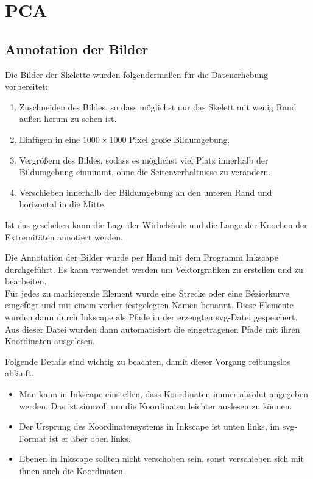 \section{PCA}
\label{implementation_detail_pca}

\subsection{Annotation der Bilder}

Die Bilder der Skelette wurden folgendermaßen für die Datenerhebung vorbereitet:
 
 \begin{enumerate}
  \item Zuschneiden des Bildes, so dass möglichst nur das Skelett mit wenig Rand außen herum zu sehen ist.
  \item Einfügen in eine $1000 \times 1000$ Pixel große Bildumgebung.
  \item Vergrößern des Bildes, sodass es möglichst viel Platz innerhalb der Bildumgebung einnimmt, ohne die Seitenverhältnisse zu verändern.
  \item Verschieben innerhalb der Bildumgebung an den unteren Rand und horizontal in die Mitte.
 \end{enumerate}

 Ist das geschehen kann die Lage der Wirbelsäule und die Länge der Knochen der Extremitäten annotiert werden.
 
Die Annotation der Bilder wurde per Hand mit dem Programm Inkscape \cite{inkscape} durchgeführt. Es kann verwendet werden um Vektorgrafiken zu erstellen und zu bearbeiten.\\
Für jedes zu markierende Element wurde eine Strecke oder eine Bézierkurve eingefügt und mit einem vorher festgelegten Namen benannt. Diese Elemente wurden dann durch Inkscape als Pfade in der erzeugten svg-Datei gespeichert. Aus dieser Datei wurden dann automatisiert die eingetragenen Pfade mit ihren Koordinaten ausgelesen.

Folgende Details sind wichtig zu beachten, damit dieser Vorgang reibungslos abläuft. 
\begin{itemize}
 \item Man kann in Inkscape einstellen, dass Koordinaten immer absolut angegeben werden. Das ist sinnvoll um die Koordinaten leichter auslesen zu können.
 \item Der Ursprung des Koordinatensystems in Inkscape ist unten links, im svg-Format ist er aber oben links.
 \item Ebenen in Inkscape sollten nicht verschoben sein, sonst verschieben sich mit ihnen auch die Koordinaten.  
\end{itemize}

